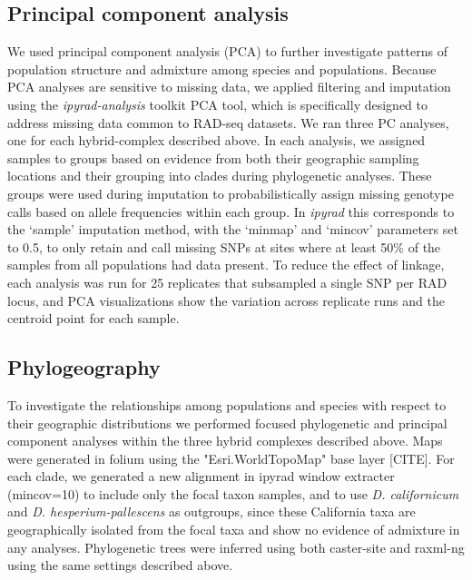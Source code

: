 \documentclass[11pt]{article}
\begin{document}
\subsection{Principal component analysis}
We used principal component analysis (PCA) to further investigate patterns of
population structure and admixture among species and populations. Because PCA 
analyses are sensitive to missing data, we applied filtering and imputation 
using the \emph{ipyrad-analysis} toolkit PCA tool, which is specifically 
designed to address missing data common to RAD-seq datasets. 
% 
We ran three PC analyses, one for each hybrid-complex described above. 
In each analysis, we assigned samples to groups based on evidence from 
both their geographic sampling locations and their grouping into clades 
during phylogenetic analyses. These groups were used during imputation to 
probabilistically assign missing genotype calls based on allele frequencies
within each group. 
In \emph{ipyrad} this corresponds to the ‘sample’ imputation
method, with the ‘minmap’ and ‘mincov’ parameters set to 0.5, to only retain 
and call missing SNPs at sites where at least 50\% of the samples from all 
populations had data present. 
To reduce the effect of linkage, each analysis was run for 25 replicates
that subsampled a single SNP per RAD locus, and PCA visualizations show 
the variation across replicate runs and the centroid point for each sample.


\subsection{Phylogeography}
To investigate the relationships among populations and species with respect
to their geographic distributions we performed focused phylogenetic and principal
component analyses within the three hybrid complexes described above. 
Maps were generated in folium using the "Esri.WorldTopoMap" base layer [CITE].
For each clade, we generated a new alignment in ipyrad window extracter (mincov=10) 
to include only the focal taxon samples, and to use \emph{D. californicum} and 
\emph{D. hesperium-pallescens} as outgroups, since these California taxa are
geographically isolated from the focal taxa and show no evidence of admixture
in any analyses. Phylogenetic trees were inferred using both caster-site and raxml-ng using the same settings described above.
\end{document}
